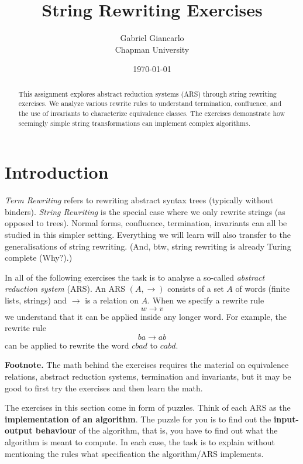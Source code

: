 \documentclass{article}
\title{String Rewriting Exercises}
\author{Gabriel Giancarlo \\ Chapman University}
\date{\today}
\theoremstyle{plain}
\theoremstyle{definition}
\theoremstyle{remark}
\begin{document}
\maketitle

\begin{abstract}
This assignment explores abstract reduction systems (ARS) through string rewriting exercises. We analyze various rewrite rules to understand termination, confluence, and the use of invariants to characterize equivalence classes. The exercises demonstrate how seemingly simple string transformations can implement complex algorithms.
\end{abstract}

\section{Introduction}

\textit{Term Rewriting} refers to rewriting abstract syntax trees (typically without binders). 
\textit{String Rewriting} is the special case where we only rewrite strings (as opposed to trees). 
Normal forms, confluence, termination, invariants can all be studied in this simpler setting. 
Everything we will learn will also transfer to the generalisations of string rewriting. 
(And, btw, string rewriting is already Turing complete (Why?).)

\bigskip

In all of the following exercises the task is to analyse a so-called \textit{abstract reduction system} (ARS). 
An ARS $(A,\to)$ consists of a set $A$ of words (finite lists, strings) and $\to$ is a relation on $A$. 
When we specify a rewrite rule
\[
w \to v
\]
we understand that it can be applied inside any longer word. 
For example, the rewrite rule
\[
ba \to ab
\]
can be applied to rewrite the word $cbad$ to $cabd$.

\bigskip

\noindent\textbf{Footnote.} 
The math behind the exercises requires the material on equivalence relations, abstract reduction systems, termination and invariants, but it may be good to first try the exercises and then learn the math.

\bigskip

The exercises in this section come in form of puzzles. 
Think of each ARS as the \textbf{implementation of an algorithm}. 
The puzzle for you is to find out the \textbf{input-output behaviour} of the algorithm, that is, you have to find out what the algorithm is meant to compute. 
In each case, the task is to explain without mentioning the rules what specification the algorithm/ARS implements.
\end{document}
